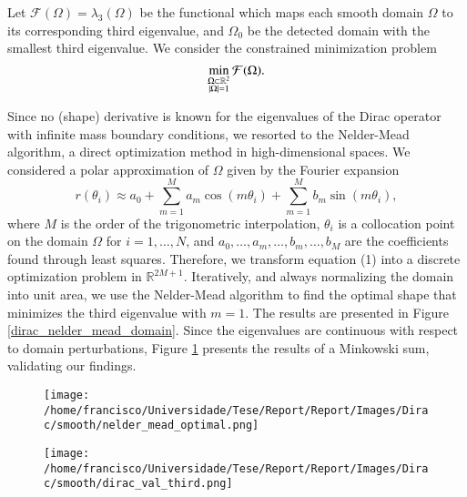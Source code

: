 \documentclass[5p,authoryear]{elsarticle}
\begin{document}
Let $\mathcal{F}(\Omega) = \lambda_3(\Omega)$ be the functional which maps each smooth domain $\Omega$ to its corresponding third eigenvalue, and $\Omega_0$ be the detected domain with the smallest third eigenvalue. We consider the constrained minimization problem
\begin{equation}
    \min_{\substack{\Omega \subset \mathbb{R}^2 \\ \abs{\Omega}=1}} \mathcal{F}(\Omega).
\end{equation}

Since no (shape) derivative is known for the eigenvalues of the Dirac operator with infinite mass boundary conditions, we resorted to the Nelder-Mead algorithm, a direct optimization method in high-dimensional spaces. We considered a polar approximation of $\Omega$ given by the Fourier expansion
\begin{equation}
    r(\theta_i) \approx a_0 + \sum_{m=1}^{M}a_m \cos(m \theta_i) + \sum_{m=1}^{M}b_m \sin(m \theta_i),
\end{equation}
where $M$ is the order of the trigonometric interpolation, $\theta_i$ is a collocation point on the domain $\Omega$ for $i=1,\dots,N$, and $a_0,\dots, a_m,\dots, b_m,\dots,b_M$ are the coefficients found through least squares. Therefore, we transform equation (1) into a discrete optimization problem in $\mathbb{R}^{2M+1}$. Iteratively, and always normalizing the domain into unit area, we use the Nelder-Mead algorithm to find the optimal shape that minimizes the third eigenvalue with $m=1$. The results are presented in Figure \ref{dirac_nelder_mead_domain}. Since the eigenvalues are continuous with respect to domain perturbations, Figure \ref{dirac_val_third} presents the results of a Minkowski sum, validating our findings.
\begin{figure}
    \centering
    \begin{minipage}{.26\textwidth}
        \centering
        \texttt{[image: /home/francisco/Universidade/Tese/Report/Report/Images/Dirac/smooth/nelder\_mead\_optimal.png]}
        \captionsetup{width=0.8\linewidth} %
        \label{dirac_nelder_mead_domain}
    \end{minipage}%
    \begin{minipage}{.26\textwidth}
        \centering
        \texttt{[image: /home/francisco/Universidade/Tese/Report/Report/Images/Dirac/smooth/dirac\_val\_third.png]}
        \captionsetup{width=0.8\linewidth} %
        \label{dirac_val_third}
    \end{minipage}
\end{figure}
\end{document}
